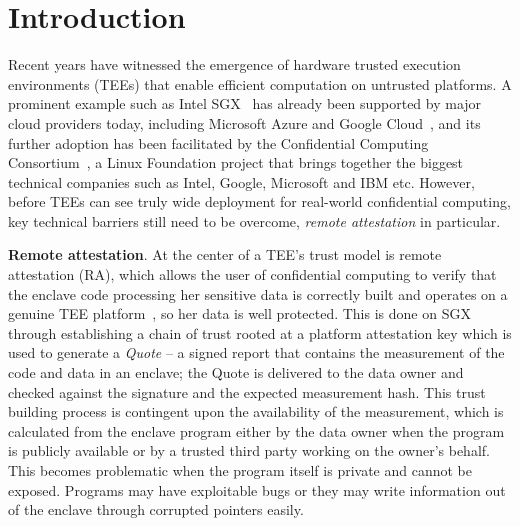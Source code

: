 \section{Introduction}\label{sec-introduction}

Recent years have witnessed the emergence of hardware trusted execution environments (TEEs) that enable efficient computation on untrusted platforms. 
A prominent example such as Intel SGX~\cite{mckeen2013innovative} has already been supported by major cloud providers today, including Microsoft Azure and Google Cloud~\cite{russinovich2017introducing,asylo2019}, and its further adoption has been facilitated by the Confidential Computing Consortium~\cite{ccc2019}, a Linux Foundation project that brings together the biggest technical companies such as Intel, Google, Microsoft and IBM etc. However, before TEEs can see truly wide deployment for real-world confidential computing, key technical barriers still need to be overcome, \textit{remote attestation} in particular.

\vspace{3pt}\noindent\textbf{Remote attestation}. At the center of a TEE's trust model is remote attestation (RA), which allows the user of confidential computing to verify that the enclave code processing her sensitive data is correctly built and operates on a genuine TEE platform~\cite{zhang2017presence}, so her data is well protected. This is done on SGX through establishing a chain of trust rooted at a platform attestation key 
which is used to generate a \textit{Quote} -- a signed report that contains the measurement of the code and data in an enclave; the Quote is delivered to the data owner and checked against the signature and the expected measurement hash. This trust building process is contingent upon the availability of the measurement, which is calculated from the enclave program either by the data owner when the program is publicly available or by a trusted third party working on the owner's behalf. This becomes problematic when the program itself is private and cannot be exposed.
Programs may have exploitable bugs or they may write information out of the enclave through corrupted pointers easily.
\DIFaddbegin 

